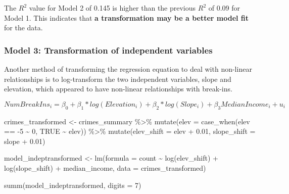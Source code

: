 \documentclass[
]{article}
\newenvironment{Shaded}{\begin{snugshade}}{\end{snugshade}}
\newcommand{\AttributeTok}[1]{\textcolor[rgb]{0.77,0.63,0.00}{#1}}
\newcommand{\ConstantTok}[1]{\textcolor[rgb]{0.00,0.00,0.00}{#1}}
\newcommand{\DecValTok}[1]{\textcolor[rgb]{0.00,0.00,0.81}{#1}}
\newcommand{\FloatTok}[1]{\textcolor[rgb]{0.00,0.00,0.81}{#1}}
\newcommand{\FunctionTok}[1]{\textcolor[rgb]{0.00,0.00,0.00}{#1}}
\newcommand{\NormalTok}[1]{#1}
\newcommand{\OtherTok}[1]{\textcolor[rgb]{0.56,0.35,0.01}{#1}}
\newcommand{\SpecialCharTok}[1]{\textcolor[rgb]{0.00,0.00,0.00}{#1}}
\begin{document}
The \(R^2\) value for Model 2 of 0.145 is higher than the previous
\(R^2\) of 0.09 for Model 1. This indicates that \textbf{a
transformation may be a better model fit} for the data.

\hypertarget{model-3-transformation-of-independent-variables}{%
\subsubsection{Model 3: Transformation of independent
variables}\label{model-3-transformation-of-independent-variables}}

Another method of transforming the regression equation to deal with
non-linear relationships is to log-transform the two independent
variables, slope and elevation, which appeared to have non-linear
relationships with break-ins.

\[NumBreakIns_i = \beta_0 + \beta_1*log(Elevation_i) + \beta_2*log(Slope_i) + \beta_3MedianIncome_i + u_i\]

\begin{Shaded}
\begin{Highlighting}[]
\NormalTok{crimes\_transformed }\OtherTok{\textless{}{-}}\NormalTok{ crimes\_summary }\SpecialCharTok{\%\textgreater{}\%}
  \FunctionTok{mutate}\NormalTok{(}\AttributeTok{elev =} \FunctionTok{case\_when}\NormalTok{(elev }\SpecialCharTok{==} \SpecialCharTok{{-}}\DecValTok{5} \SpecialCharTok{\textasciitilde{}} \DecValTok{0}\NormalTok{,}
                          \ConstantTok{TRUE} \SpecialCharTok{\textasciitilde{}}\NormalTok{ elev)) }\SpecialCharTok{\%\textgreater{}\%} 
  \FunctionTok{mutate}\NormalTok{(}\AttributeTok{elev\_shift =}\NormalTok{ elev }\SpecialCharTok{+} \FloatTok{0.01}\NormalTok{,}
         \AttributeTok{slope\_shift =}\NormalTok{ slope }\SpecialCharTok{+} \FloatTok{0.01}\NormalTok{)}

\NormalTok{model\_indeptransformed }\OtherTok{\textless{}{-}} \FunctionTok{lm}\NormalTok{(}\AttributeTok{formula =}\NormalTok{ count }\SpecialCharTok{\textasciitilde{}} \FunctionTok{log}\NormalTok{(elev\_shift) }\SpecialCharTok{+} \FunctionTok{log}\NormalTok{(slope\_shift) }\SpecialCharTok{+}\NormalTok{ median\_income, }\AttributeTok{data =}\NormalTok{ crimes\_transformed)}

\FunctionTok{summ}\NormalTok{(model\_indeptransformed, }\AttributeTok{digits =} \DecValTok{7}\NormalTok{)}
\end{Highlighting}
\end{Shaded}
\end{document}
